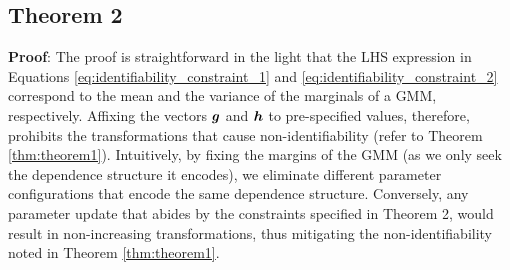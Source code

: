 \documentclass{article}
\theoremstyle{plain}
\theoremstyle{definition}
\theoremstyle{remark}
\begin{document}
\subsection{Theorem 2} \label{apd:Proof_theorem_2}
\textbf{Proof}: The proof is straightforward in the light that the LHS expression in Equations \eqref{eq:identifiability_constraint_1} and \eqref{eq:identifiability_constraint_2} correspond to the mean and the variance of the marginals of a GMM, respectively. Affixing the vectors $\boldsymbol{g}$ and $\boldsymbol{h}$ to pre-specified values, therefore, prohibits the transformations that cause non-identifiability  (refer to Theorem \ref{thm:theorem1}). Intuitively, by fixing the margins of the GMM (as we only seek the dependence structure it encodes), we eliminate different parameter configurations that encode the same dependence structure. Conversely, any parameter update that abides by the constraints specified in Theorem 2, would result in non-increasing transformations, thus mitigating the non-identifiability noted in Theorem \ref{thm:theorem1}.

\end{document}
